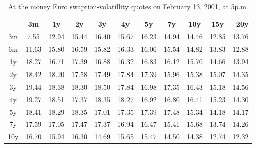 \begin{table}[H]
    \centering
\begin{tabular}{|c|c|c|c|c|c|c|c|c|c|r|}
  \hline
  &3m&1y&2y&3y&4y&5y&7y&10y&15y&20y\\
  \hline

3m& 7.55 & 12.94 & 15.44 & 16.40 & 15.67 & 16.23 & 14.94 & 14.46 & 12.85 & 13.76\\
6m & 11.63 & 15.80 & 16.59 & 15.82 & 16.33 & 16.06 & 15.54 & 14.82 & 13.83 & 12.88\\
1y& 18.27 & 16.71 & 17.39 & 16.88 & 16.32 & 16.83 & 16.12 & 15.70 & 14.66 & 13.94\\
2y&18.42 & 18.20 & 17.58 & 17.49 & 17.84 & 17.39 & 15.96 & 15.38 & 15.07 & 14.35\\
3y&19.44 & 18.38 & 18.30 & 18.50 & 17.84 & 16.98 & 17.35 & 16.43 & 15.18 & 14.56\\
4y&19.27 & 18.51 & 17.37 & 18.35 & 18.27 & 16.92 & 16.80 & 16.41 & 15.23 & 14.30\\
5y&18.41 & 18.29 & 18.35 & 17.01 & 17.35 & 17.39 & 17.48 & 15.34 & 14.18 & 14.17\\
7y&17.59 & 17.05 & 17.47 & 17.37 & 16.94 & 16.47 & 15.41 & 15.68 & 13.74 & 14.26\\
10y&16.70 & 15.94 & 16.30 & 14.69 & 15.65 & 15.47 & 14.50 & 14.38 & 12.74 & 12.32\\
  \hline
\end{tabular}
\caption{At the money Euro swaption-volatillity quotes on February 13, 2001, at 5p.m.}
\end{table}
  
